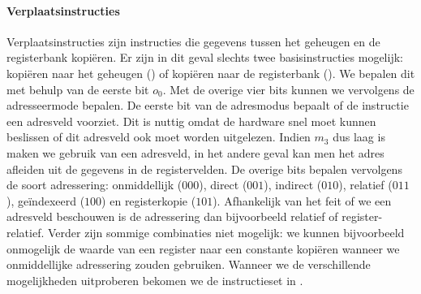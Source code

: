 \paragraph{Verplaatsinstructies}
Verplaatsinstructies zijn instructies die gegevens tussen het geheugen en de registerbank kopi\"eren. Er zijn in dit geval slechts twee basisinstructies mogelijk: kopi\"eren naar het geheugen () of kopi\"eren naar de registerbank (). We bepalen dit met behulp van de eerste bit $o_0$. Met de overige vier bits kunnen we vervolgens de adresseermode bepalen. De eerste bit van de adresmodus bepaalt of de instructie een adresveld voorziet. Dit is nuttig omdat de hardware snel moet kunnen beslissen of dit adresveld ook moet worden uitgelezen. Indien $m_3$ dus laag is maken we gebruik van een adresveld, in het andere geval kan men het adres afleiden uit de gegevens in de registervelden. De overige bits bepalen vervolgens de soort adressering: onmiddellijk ($000$), direct ($001$), indirect ($010$), relatief ($011$), ge\"indexeerd ($100$) en registerkopie ($101$). Afhankelijk van het feit of we een adresveld beschouwen is de adressering dan bijvoorbeeld relatief of register-relatief. Verder zijn sommige combinaties niet mogelijk: we kunnen bijvoorbeeld onmogelijk de waarde van een register naar een constante kopi\"eren wanneer we onmiddellijke adressering zouden gebruiken. Wanneer we de verschillende mogelijkheden uitproberen bekomen we de instructieset in .
